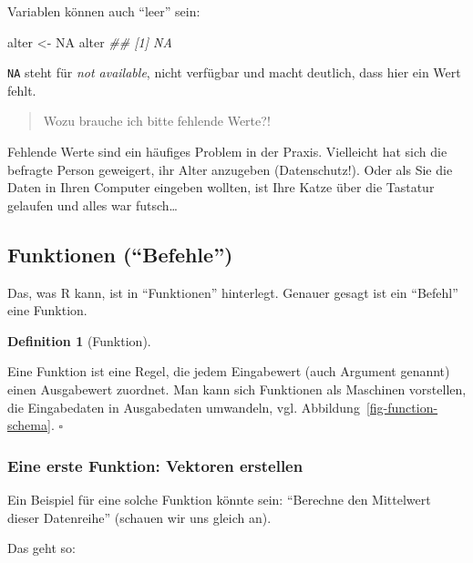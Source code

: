 \documentclass[
  letterpaper,
]{scrbook}
\newenvironment{Shaded}{\begin{snugshade}}{\end{snugshade}}
\newcommand{\ConstantTok}[1]{\textcolor[rgb]{0.56,0.35,0.01}{#1}}
\newcommand{\DocumentationTok}[1]{\textcolor[rgb]{0.37,0.37,0.37}{\textit{#1}}}
\newcommand{\NormalTok}[1]{\textcolor[rgb]{0.00,0.23,0.31}{#1}}
\newcommand{\OtherTok}[1]{\textcolor[rgb]{0.00,0.23,0.31}{#1}}
\theoremstyle{definition}
\theoremstyle{definition}
\newtheorem{definition}{Definition}[chapter]
\theoremstyle{definition}
\theoremstyle{remark}
\begin{document}
Variablen können auch ``leer'' sein:

\begin{Shaded}
\begin{Highlighting}[]
\NormalTok{alter }\OtherTok{\textless{}{-}} \ConstantTok{NA}
\NormalTok{alter}
\DocumentationTok{\#\# [1] NA}
\end{Highlighting}
\end{Shaded}

\texttt{NA} steht für \emph{not available}, nicht verfügbar und macht
deutlich, dass hier ein Wert fehlt.

\begin{quote}
{} Wozu brauche ich bitte fehlende Werte?!
\end{quote}

Fehlende Werte sind ein häufiges Problem in der Praxis. Vielleicht hat
sich die befragte Person geweigert, ihr Alter anzugeben (Datenschutz!).
Oder als Sie die Daten in Ihren Computer eingeben wollten, ist Ihre
Katze über die Tastatur gelaufen und alles war futsch\ldots{}

\subsection{Funktionen (``Befehle'')}\label{funktionen-befehle}

Das, was R kann, ist in ``Funktionen'' hinterlegt. Genauer gesagt ist
ein ``Befehl'' eine Funktion.

\begin{definition}[Funktion]\protect\hypertarget{def-fun}{}\label{def-fun}

Eine Funktion ist eine Regel, die jedem Eingabewert (auch Argument
genannt) einen Ausgabewert zuordnet. Man kann sich Funktionen als
Maschinen vorstellen, die Eingabedaten in Ausgabedaten umwandeln, vgl.
Abbildung~\ref{fig-function-schema}. \(\square\)

\end{definition}

\subsubsection{Eine erste Funktion: Vektoren
erstellen}\label{eine-erste-funktion-vektoren-erstellen}

Ein Beispiel für eine solche Funktion könnte sein: ``Berechne den
Mittelwert dieser Datenreihe'' (schauen wir uns gleich an).

Das geht so:
\end{document}
